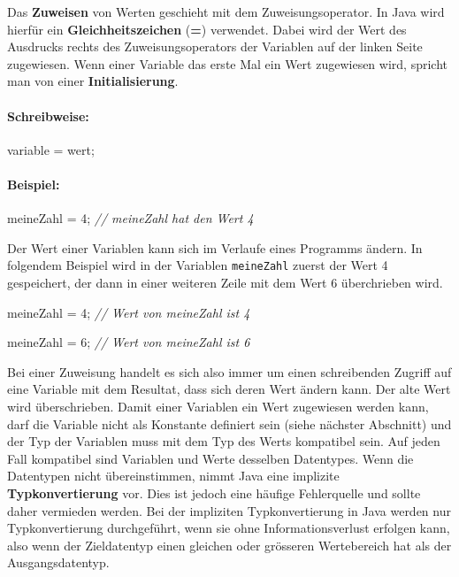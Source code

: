 \documentclass[10pt,paper=17cm:22cm, twoside=true, DIV=14]{scrbook}
\newenvironment {Shaded}
        {\begin{mdframed}[style=code] }
         {\end{mdframed}}
\newcommand{\DecValTok}[1]{\textcolor[rgb]{0.4,0.4,0.4}{{#1}}}
\newcommand{\CommentTok}[1]{\textcolor[RGB]{128,128,128}{\textit{#1}}}
\newcommand{\NormalTok}[1]{#1}
\begin{document}
Das \textbf{Zuweisen} von Werten geschieht mit dem Zuweisungsoperator.
In Java wird hierfür ein \textbf{Gleichheitszeichen} (\textbf{=})
verwendet. Dabei wird der Wert des Ausdrucks rechts des
Zuweisungsoperators der Variablen auf der linken Seite zugewiesen. Wenn
einer Variable das erste Mal ein Wert zugewiesen wird, spricht man von
einer \textbf{Initialisierung}.

\paragraph{Schreibweise:}\label{schreibweise-4}

\begin{Shaded}
\begin{Highlighting}[]
\NormalTok{variable = wert;}
\end{Highlighting}
\end{Shaded}

\paragraph{Beispiel:}\label{beispiel-11}

\begin{Shaded}
\begin{Highlighting}[]
\NormalTok{meineZahl = }\DecValTok{4}\NormalTok{;}
\CommentTok{// meineZahl hat den Wert 4}
\end{Highlighting}
\end{Shaded}

Der Wert einer Variablen kann sich im Verlaufe eines Programms ändern.
In folgendem Beispiel wird in der Variablen \texttt{meineZahl} zuerst
der Wert 4 gespeichert, der dann in einer weiteren Zeile mit dem Wert 6
überchrieben wird.

\begin{Shaded}
\begin{Highlighting}[]
\NormalTok{meineZahl = }\DecValTok{4}\NormalTok{;}
\CommentTok{// Wert von meineZahl ist 4}

\NormalTok{meineZahl = }\DecValTok{6}\NormalTok{;}
\CommentTok{// Wert von meineZahl ist 6}
\end{Highlighting}
\end{Shaded}

Bei einer Zuweisung handelt es sich also immer um einen schreibenden
Zugriff auf eine Variable mit dem Resultat, dass sich deren Wert ändern
kann. Der alte Wert wird überschrieben. Damit einer Variablen ein Wert
zugewiesen werden kann, darf die Variable nicht als Konstante definiert
sein (siehe nächster Abschnitt) und der Typ der Variablen muss mit dem
Typ des Werts kompatibel sein. Auf jeden Fall kompatibel sind Variablen
und Werte desselben Datentypes. Wenn die Datentypen nicht
übereinstimmen, nimmt Java eine implizite \textbf{Typkonvertierung} vor.
Dies ist jedoch eine häufige Fehlerquelle und sollte daher vermieden
werden. Bei der impliziten Typkonvertierung in Java werden nur
Typkonvertierung durchgeführt, wenn sie ohne Informationsverlust
erfolgen kann, also wenn der Zieldatentyp einen gleichen oder grösseren
Wertebereich hat als der Ausgangsdatentyp.
\end{document}
